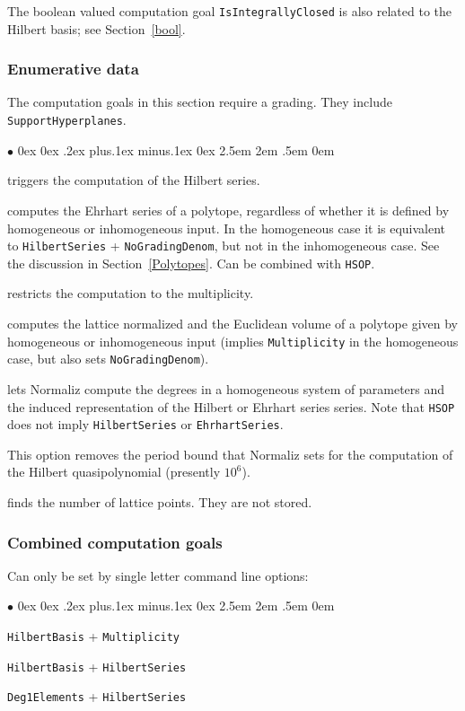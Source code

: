 \documentclass[12pt,a4paper]{scrartcl}
\newcommand{\stdli}{ \topsep0ex \partopsep0ex %
\parsep.2ex plus.1ex minus.1ex \itemsep0ex%
\leftmargin2.5em \labelwidth2em \labelsep.5em \rightmargin0em}%
\renewenvironment{itemize}{\begin{list}{{$\bullet$}}{\stdli}}{\end{list}}
\theoremstyle{definition}
\def\itemtt[#1]{\item[\textbf{\ttt{#1}}]}
\def\ttt{\texttt}
\begin{document}
The boolean valued computation goal \verb|IsIntegrallyClosed| is also related to the Hilbert basis; see Section~\ref{bool}.

\subsubsection{Enumerative data}

The computation goals in this section require a grading. They include \verb|SupportHyperplanes|.

\begin{itemize}
	\itemtt [HilbertSeries,-q] triggers the computation of the Hilbert series.
	
	\itemtt[EhrhartSeries] computes the Ehrhart series of a polytope, regardless of whether it is defined by homogeneous or inhomogeneous input. In the homogeneous case it is equivalent to \verb|HilbertSeries| + \verb|NoGradingDenom|, but not in the inhomogeneous case. See the discussion in Section~\ref{Polytopes}. Can be combined with \verb|HSOP|.
	
	\itemtt[Multiplicity, -v] restricts the computation to the multiplicity.
	
	\itemtt[Volume, -V] computes the lattice normalized and the Euclidean volume of a polytope given by homogeneous or inhomogeneous input (implies \verb|Multiplicity| in the homogeneous case, but also sets \verb|NoGradingDenom|).
	
	\itemtt[HSOP] lets Normaliz compute the degrees in a homogeneous system of parameters and the induced representation of the Hilbert or Ehrhart series series. Note that \ttt{HSOP} does not imply \ttt{HilbertSeries} or \ttt{EhrhartSeries}.
	
	\itemtt[NoPeriodBound] This option removes the period bound that Normaliz sets for the computation of the Hilbert quasipolynomial (presently $10^6$).
	
	\itemtt[NumberLatticePoints] finds the number of lattice points. They are not stored.
\end{itemize}

\subsubsection{Combined computation goals}

Can only be set by single letter command line options:

\begin{itemize}
	\itemtt[-n] \verb|HilbertBasis| + \verb|Multiplicity|
	
	\itemtt[-h] \verb|HilbertBasis| + \verb|HilbertSeries|
	
	\itemtt[-p] \verb|Deg1Elements| + \verb|HilbertSeries|
	
\end{itemize}
\end{document}
